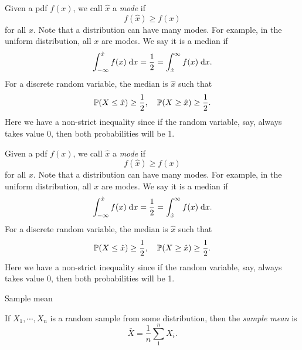\begin{note}
  \begin{field}
    \begin{defi}
      Given a pdf $f(x)$, we call $\hat x$ a \emph{mode} if
      \[
        f(\hat x) \geq f(x)
      \]
      for all $x$. Note that a distribution can have many modes. For example, in the uniform distribution, all $x$ are modes.
      We say it is a median if
      \[
        \int_{-\infty}^{\hat x}f(x)\;\d x = \frac{1}{2} = \int_{\hat x}^\infty f(x)\;\d x.
      \]
      For a discrete random variable, the median is $\hat x$ such that
      \[
        \P(X \leq \hat x) \geq \frac{1}{2}, \quad \P(X \geq \hat x) \geq \frac{1}{2}.
      \]
      Here we have a non-strict inequality since if the random variable, say, always takes value $0$, then both probabilities will be 1.
    \end{defi}
  \end{field}
  \begin{field}
    \begin{defi}
      Given a pdf $f(x)$, we call $\hat x$ a \emph{mode} if
      \[
        f(\hat x) \geq f(x)
      \]
      for all $x$. Note that a distribution can have many modes. For example, in the uniform distribution, all $x$ are modes.
      We say it is a median if
      \[
        \int_{-\infty}^{\hat x}f(x)\;\d x = \frac{1}{2} = \int_{\hat x}^\infty f(x)\;\d x.
      \]
      For a discrete random variable, the median is $\hat x$ such that
      \[
        \P(X \leq \hat x) \geq \frac{1}{2}, \quad \P(X \geq \hat x) \geq \frac{1}{2}.
      \]
      Here we have a non-strict inequality since if the random variable, say, always takes value $0$, then both probabilities will be 1.
    \end{defi}
  \end{field}
  \xplain{}%
\end{note}

%
\begin{note}
  \begin{field}
    Sample mean
  \end{field}
  \begin{field}
    \begin{defi}
      If $X_1, \cdots, X_n$ is a random sample from some distribution, then the \emph{sample mean} is
      \[
        \bar X = \frac{1}{n}\sum_1^n X_i.
      \]
    \end{defi}
  \end{field}
  \xplain{}%
\end{note}

